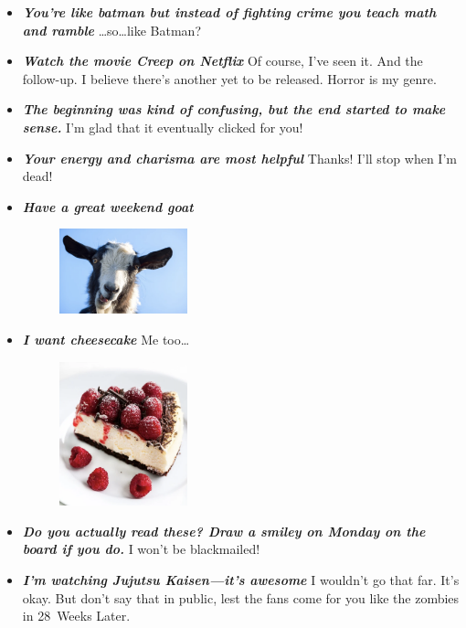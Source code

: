 \documentclass[11pt,letterpaper]{article}
\begin{document}
\begin{itemize}
\item {\bfseries\itshape You're like batman but instead of fighting crime you teach math and ramble} \dots so\dots like Batman?

\item {\bfseries\itshape Watch the movie Creep on Netflix} Of course, I've seen it. And the follow-up. I believe there's another yet to be released. Horror is my genre. 

\item {\bfseries\itshape The beginning was kind of confusing, but the end started to make sense.} I'm glad that it eventually clicked for you!

\item {\bfseries\itshape Your energy and charisma are most helpful} Thanks! I'll stop when I'm dead!

\item {\bfseries\itshape Have a great weekend goat}
	\begin{figure}[H]
	\centering
	\includegraphics[width=0.35\textwidth]{images/goat.png}
	\end{figure}


\item {\bfseries\itshape I want cheesecake} Me too\dots
	\begin{figure}[H]
	\centering
	\includegraphics[width=0.35\textwidth]{images/cheesecake.png}
	\end{figure}

\item {\bfseries\itshape Do you actually read these? Draw a smiley on Monday on the board if you do.} I won't be blackmailed!

\item {\bfseries\itshape I'm watching Jujutsu Kaisen---it's awesome} I wouldn't go that far. It's okay. But don't say that in public, lest the fans come for you like the zombies in 28~Weeks Later. 


\end{itemize}
\end{document}
